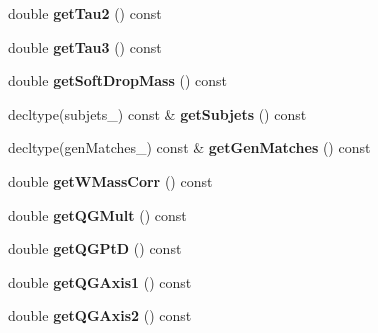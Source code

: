 \begin{DoxyCompactItemize}
\item 
\hypertarget{classConstituent_aa43ea922dc8db06b1b28b8a66db0edac}{double {\bfseries get\-Tau2} () const }\label{classConstituent_aa43ea922dc8db06b1b28b8a66db0edac}

\item 
\hypertarget{classConstituent_ac33bc6f45eca6ce4fc6f5cef83159156}{double {\bfseries get\-Tau3} () const }\label{classConstituent_ac33bc6f45eca6ce4fc6f5cef83159156}

\item 
\hypertarget{classConstituent_a0aa688482470252d075d07e9467e21c0}{double {\bfseries get\-Soft\-Drop\-Mass} () const }\label{classConstituent_a0aa688482470252d075d07e9467e21c0}

\item 
\hypertarget{classConstituent_a07f258d8045b1dc37fecf10b44448ba4}{decltype(subjets\-\_\-) const \& {\bfseries get\-Subjets} () const }\label{classConstituent_a07f258d8045b1dc37fecf10b44448ba4}

\item 
\hypertarget{classConstituent_a228e250e72e942fdea1681b410f4678d}{decltype(gen\-Matches\-\_\-) const \& {\bfseries get\-Gen\-Matches} () const }\label{classConstituent_a228e250e72e942fdea1681b410f4678d}

\item 
\hypertarget{classConstituent_a01bc43e8507edb0dd049a0116ce1eb2f}{double {\bfseries get\-W\-Mass\-Corr} () const }\label{classConstituent_a01bc43e8507edb0dd049a0116ce1eb2f}

\item 
\hypertarget{classConstituent_aac16a1b470590029529d1a6b77d50f41}{double {\bfseries get\-Q\-G\-Mult} () const }\label{classConstituent_aac16a1b470590029529d1a6b77d50f41}

\item 
\hypertarget{classConstituent_a088fc8a7a9324cd7568c47d96a3d08db}{double {\bfseries get\-Q\-G\-Pt\-D} () const }\label{classConstituent_a088fc8a7a9324cd7568c47d96a3d08db}

\item 
\hypertarget{classConstituent_a6120efae2154ff7167e70e32a260fed8}{double {\bfseries get\-Q\-G\-Axis1} () const }\label{classConstituent_a6120efae2154ff7167e70e32a260fed8}

\item 
\hypertarget{classConstituent_a26c8c9244eda89d85a0441bf71a7e21e}{double {\bfseries get\-Q\-G\-Axis2} () const }\label{classConstituent_a26c8c9244eda89d85a0441bf71a7e21e}


\end{DoxyCompactItemize}
